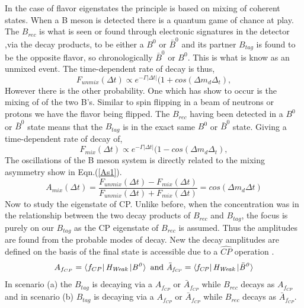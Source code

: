 In the case of flavor eigenstates the principle is based on mixing of coherent states. When a B meson is detected there is a quantum game of chance at play. The $B_{rec}$ is what is seen or found through electronic signatures in the detector ,via the decay products, to be either a $B^0$ or $\bar{B}^0$ and its partner $B_{tag}$ is found to be the opposite flavor, so chronologically $\bar{B}^0$ or $B^0$. This is what is know as an unmixed event. The time-dependent rate of decay is thus,
\begin{equation}\label{BPME13}
F_{unmix}(\Delta t) \propto e^{-\Gamma\left|\Delta t\right|}(1 + cos(\Delta m_d \Delta_t),
\end{equation}
However there is the other probability. One which has show to occur is the mixing of of the two B's. Similar to spin flipping in a beam of neutrons or protons we have the flavor being flipped. The $B_{rec}$ having been detected in a $B^0$ or $\bar{B}^0$ state means that the $B_{tag}$ is in the exact same $B^0$ or $\bar{B}^0$ state. Giving a time-dependent rate of decay of,
\begin{equation}\label{BPME14}
F_{mix}(\Delta t) \propto e^{-\Gamma\left|\Delta t\right|}(1 - cos(\Delta m_d \Delta_t),
\end{equation}
The oscillations of the B meson system is directly related to the mixing asymmetry show in Eqn.(\ref{As1}).
\begin{equation}\label{BPME15}
A_{mix}(\Delta t) = \frac{F_{unmix}(\Delta t)-F_{mix}(\Delta t)}{F_{unmix}(\Delta t)+F_{mix}(\Delta t)} = cos(\Delta m_d\Delta t) 
\end{equation}
Now to study the eigenstate of CP. Unlike before, when the concentration was in the relationship between the two decay products of $B_{rec}$ and $B_{tag}$, the focus is purely on our $B_{tag}$ as the CP eigenstate of $B_{rec}$ is assumed. Thus the amplitudes are found from the probable modes of decay. New the decay amplitudes are defined on the basis of the final state is accessible due to a $\hat{CP}$ operation \cite{B10}.
\begin{equation}\label{BPME16}
A_{f_{CP}}=\bra{f_{CP}}\it{H_{Weak}}\ket{B^{0}} \mbox{ and } \bar{A}_{f_{CP}}=\bra{f_{CP}}\it{H_{Weak}}\ket{\bar{B}^{0}}
\end{equation}
In scenario (a) the $B_{tag}$ is decaying via a $A_{f_{CP}}$ or $\bar{A}_{f_{CP}}$ while $B_{rec}$ decays as $A_{f_{CP}}$ and in scenario (b) $B_{tag}$ is decaying via a $A_{f_{CP}}$ or $\bar{A}_{f_{CP}}$ while $B_{rec}$ decays as $\bar{A}_{f_{CP}}$. 

